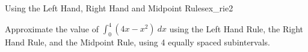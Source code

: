 %
%


\begin{example}{Using the Left Hand, Right Hand and Midpoint Rules}{ex_rie2}
 
Approximate the value of $\int_0^4 (4x-x^2)\ dx$ using the Left Hand Rule, the Right Hand Rule, and the Midpoint Rule, using 4 equally spaced subintervals.
\end{example}

